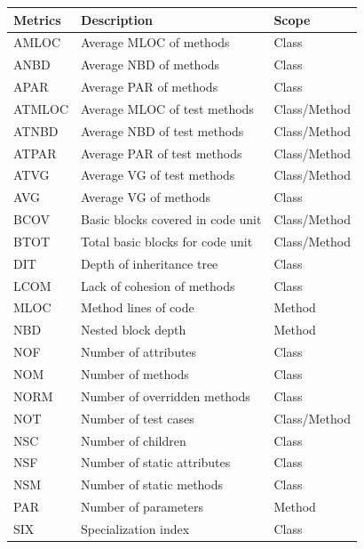 \begin{table}[!t]
  \centering
  \begin{threeparttable}
    \begin{tabular}{|l|l|l|}
      \hline
      \rowcolor[RGB]{169,196,223}
      \textbf{Metrics} & \textbf{Description} & \textbf{Scope} \\
      \hline AMLOC & Average MLOC of methods & Class \\
      \hline ANBD & Average NBD of methods & Class \\
      \hline APAR & Average PAR of methods & Class \\
      \hline ATMLOC & Average MLOC of test methods & Class/Method \\
      \hline ATNBD & Average NBD of test methods & Class/Method \\
      \hline ATPAR & Average PAR of test methods & Class/Method \\
      \hline ATVG & Average VG of test methods & Class/Method \\
      \hline AVG & Average VG of methods & Class \\
      \hline BCOV & Basic blocks covered in code unit & Class/Method \\
      \hline BTOT & Total basic blocks for code unit & Class/Method \\
      \hline DIT & Depth of inheritance tree & Class \\
      \hline LCOM & Lack of cohesion of methods & Class \\
      \hline MLOC & Method lines of code & Method \\
      \hline NBD & Nested block depth & Method \\
      \hline NOF & Number of attributes & Class \\
      \hline NOM & Number of methods & Class \\
      \hline NORM & Number of overridden methods & Class \\
      \hline NOT & Number of test cases & Class/Method \\
      \hline NSC & Number of children & Class \\
      \hline NSF & Number of static attributes & Class \\
      \hline NSM & Number of static methods & Class \\
      \hline PAR & Number of parameters & Method \\
      \hline SIX & Specialization index & Class \\

\end{tabular}
\end{threeparttable}
\end{table}
